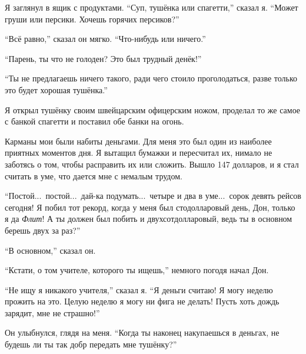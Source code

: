 Я заглянул в ящик с продуктами.
``Суп, тушёнка или спагетти,'' сказал я. ``Может груши или персики. Хочешь горячих персиков?''

``Всё равно,'' сказал он мягко. ``Что-нибудь или ничего.''

``Парень, ты что не голоден? Это был трудный денёк!''

``Ты не предлагаешь ничего такого, ради чего стоило проголодаться, разве только это будет хорошая
 тушёнка.''

Я открыл тушёнку своим швейцарским офицерским ножом, проделал то же самое с банкой спагетти
 и поставил обе банки на огонь.

Карманы мои были набиты деньгами. Для меня это был один из наиболее приятных моментов дня. Я вытащил бумажки и пересчитал их, нимало не заботясь о том, чтобы расправить их или сложить. Вышло 147 долларов, и я стал считать в уме, что дается мне с немалым трудом.

``Постой...\ постой...\ дай-ка подумать...\ четыре и два в уме...\ сорок девять рейсов сегодня!
Я побил тот рекорд, когда у меня был стодолларовый день, Дон, только я да {\it Флит\/}!
А ты должен был побить и двухсотдолларовый, ведь ты в основном берешь двух за раз?''

``В основном,'' сказал он.

``Кстати, о том учителе, которого ты ищешь,'' не\-много погодя начал Дон.

``Не ищу я никакого учителя,'' сказал я. ``Я деньги считаю! Я могу неделю прожить на это. Целую
 неделю я могу ни фига не делать! Пусть хоть дождь зарядит, мне не страшно!''

Он улыбнулся, глядя на меня.
``Когда ты наконец накупаешься в деньгах, не будешь ли ты так добр передать мне тушёнку?''

\bye
